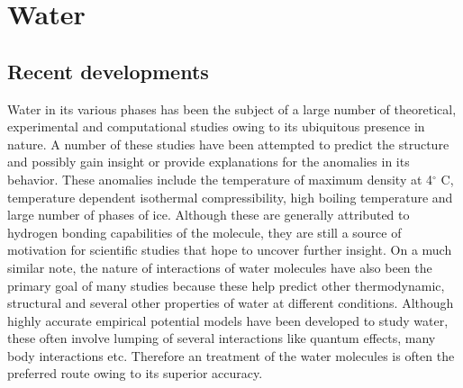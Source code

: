 \chapter{Water}
\label{chap:h2o}
\section{Recent developments}
    \label{sec:introduction}
        Water in its various phases has been the subject of a large number of theoretical, experimental and computational studies owing to its ubiquitous presence in nature. A number of these studies have been attempted to predict the structure and possibly gain insight or provide explanations for the anomalies in its behavior. These anomalies include \cite{Szalewicz2009} the temperature of maximum density at 4$^\circ$ C, temperature dependent isothermal compressibility, high boiling temperature and large number of phases of ice. Although these are generally attributed to hydrogen bonding capabilities of the molecule, they are still a source of motivation for scientific studies that hope to uncover further insight. On a much similar note, the nature of interactions of water molecules have also been the primary goal of many studies because these help predict other thermodynamic, structural and several other properties of water at different conditions. Although highly accurate empirical potential models have been developed to study water, these often involve lumping of several interactions like quantum effects, many body interactions etc. Therefore an \abinitio{} treatment of the water molecules is often the preferred route owing to its superior accuracy.
